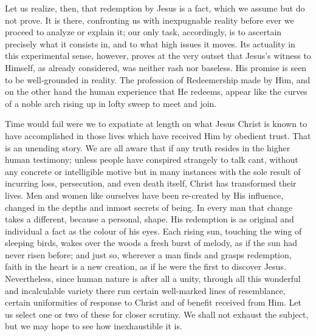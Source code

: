 \documentclass[12pt,a5paper,oneside]{book}
\begin{document}
Let us realize, then, that redemption by
Jesus is a fact, which we assume but do not
prove. It is there, confronting us with
inexpugnable reality before ever we proceed
to analyze or explain it; our only task,
accordingly, is to ascertain precisely what it
consists in, and to what high issues it moves.
Its actuality in this experimental sense, however, 
proves at the very outset that Jesus's
witness to Himself, as already considered, was
neither rash nor baseless. His promise is seen
to be well-grounded in reality. The profession
of Redeemership made by Him, and on the
other hand the human experience that He
redeems, appear like the curves of a noble
arch rising up in lofty sweep to meet and join.

Time would fail were we to expatiate at
length on what Jesus Christ is known to have
accomplished in those lives which have received
Him by obedient trust. That is an unending
story. We are all aware that if any truth resides
in the higher human testimony; unless people
have conspired strangely to talk cant, without
any concrete or intelligible motive but in many
instances with the sole result of incurring loss,
persecution, and even death itself, Christ has
transformed their lives. Men and women like
ourselves have been re-created by His influence,
changed in the depths and inmost secrets of
being. In every man that change takes a
different, because a personal, shape. His
redemption is as original and individual a fact
as the colour of his eyes. Each rising sun,
touching the wing of sleeping birds, wakes
over the woods a fresh burst of melody, as if
the sun had never risen before; and just so,
wherever a man finds and grasps redemption,
faith in the heart is a new creation, as if he were
the first to discover Jesus. Nevertheless, since
human nature is after all a unity, through
all this wonderful and incalculable variety there
run certain well-marked lines of resemblance,
certain uniformities of response to Christ and of
benefit received from Him. Let us select one
or two of these for closer scrutiny. We shall not
exhaust the subject, but we may hope to see
how inexhaustible it is.
\end{document}
